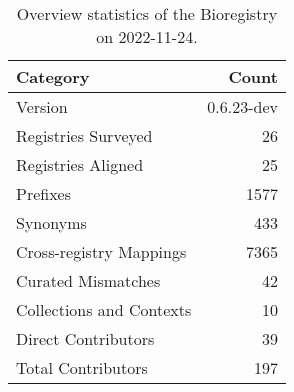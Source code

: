 \begin{table}
\centering
\caption{Overview statistics of the Bioregistry on 2022-11-24.}
\label{tab:bioregistry-summary}
\begin{tabular}{lr}
\toprule
                Category &      Count \\
\midrule
                 Version & 0.6.23-dev \\
     Registries Surveyed &         26 \\
      Registries Aligned &         25 \\
                Prefixes &       1577 \\
                Synonyms &        433 \\
 Cross-registry Mappings &       7365 \\
      Curated Mismatches &         42 \\
Collections and Contexts &         10 \\
     Direct Contributors &         39 \\
      Total Contributors &        197 \\
\bottomrule
\end{tabular}
\end{table}
